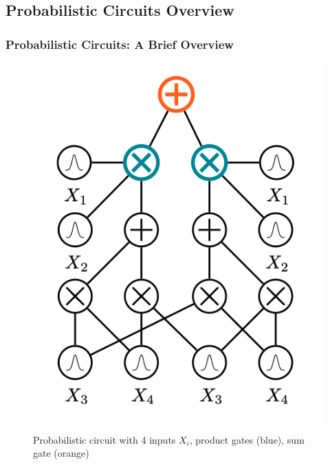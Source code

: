 \subsection{Probabilistic Circuits Overview}
\begin{frame}[t, allowframebreaks]
\frametitle{Probabilistic Circuits: A Brief Overview}
    \begin{figure}[h]
    \centering
    \includegraphics[height=0.5\textheight]{1_concepts/pc.png}
    \caption{Probabilistic circuit with 4 inputs $X_i$, product gates (blue), sum gate (orange)}
    \label{fig:pc}
\end{figure}
\end{frame}

